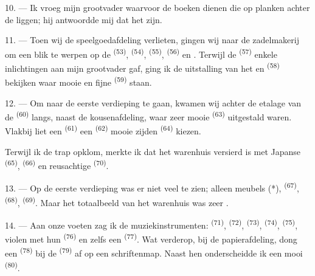 10. --- Ik vroeg mijn grootvader waarvoor de boeken dienen die op planken achter de
 liggen; hij antwoordde mij dat het  zijn.

\VUsaut{3.6mm}
\VUsaut{2.8mm}

11. --- Toen wij de speelgoedafdeling verlieten, gingen wij naar de zadelmakerij om een blik
te werpen op de  \textsuperscript{(53)},
 \textsuperscript{(54)}, 
\textsuperscript{(55)},  \textsuperscript{(56)} en
. Terwijl de  \textsuperscript{(57)}
enkele inlichtingen aan mijn grootvader gaf, ging ik de uitstalling van het
 en  \textsuperscript{(58)} bekijken waar mooie
 en fijne  \textsuperscript{(59)} staan.

12. --- Om naar de eerste verdieping te gaan, kwamen wij achter de etalage van de
 \textsuperscript{(60)} langs, naast de kousenafdeling, waar zeer mooie
 \textsuperscript{(63)} uitgestald waren. Vlakbij liet een
 \textsuperscript{(61)} een
 \textsuperscript{(62)} mooie zijden 
\textsuperscript{(64)} kiezen.

Terwijl ik de trap opklom, merkte ik dat het warenhuis versierd is met Japanse
 \textsuperscript{(65)}, 
\textsuperscript{(66)} en reusachtige  \textsuperscript{(70)}.

13. --- Op de eerste verdieping was er niet veel te zien; alleen meubels (*),
 \textsuperscript{(67)}, 
\textsuperscript{(68)},  \textsuperscript{(69)}. Maar het totaalbeeld van
het warenhuis was zeer .

14. --- Aan onze voeten zag ik de muziekinstrumenten:  \textsuperscript{(71)},
 \textsuperscript{(72)},
 \textsuperscript{(73)}, 
\textsuperscript{(74)},  \textsuperscript{(75)}, violen met hun
 \textsuperscript{(76)} en zelfs een 
\textsuperscript{(77)}. Wat verderop, bij de papierafdeling, dong een
 \textsuperscript{(78)} bij de 
\textsuperscript{(79)} af op een schriftenmap. Naast hen onderscheidde ik een mooi
 \textsuperscript{(80)}.

